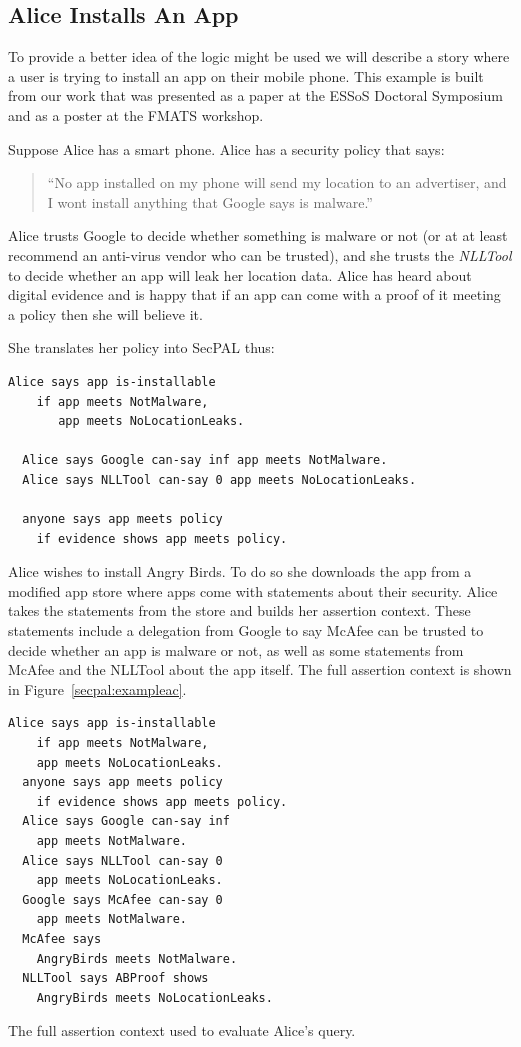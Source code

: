 \documentclass[a4paper,12pt,sfsidenotes]{tufte-book}
\begin{document}
\subsection{Alice Installs An App}

To provide a better idea of the logic might be used we will describe a story
where a user is trying to install an app on their mobile phone.  This example is
built from our work that was presented as a paper at the ESSoS Doctoral
Symposium\cite{Hallett:2014un} and as a poster at the FMATS workshop.

Suppose Alice has a smart phone.  Alice has a security policy that says:

\begin{quote}
    ``No app installed on my phone will send my location to an advertiser, and I
      wont install anything that Google says is malware.''
\end{quote}

Alice trusts Google to decide whether something is malware or not (or at at
least recommend an anti-virus vendor who can be trusted), and she trusts the
\emph{NLLTool} to decide whether an app will leak her location
data.  Alice has heard about digital evidence and is happy that if an app can
come with a proof of it meeting a policy then she will believe it.

She translates her policy into SecPAL thus:

\begin{lstlisting}[language=SecPAL]
  Alice says app is-installable 
    if app meets NotMalware, 
       app meets NoLocationLeaks.

  Alice says Google can-say inf app meets NotMalware.
  Alice says NLLTool can-say 0 app meets NoLocationLeaks.

  anyone says app meets policy
    if evidence shows app meets policy.
\end{lstlisting}

Alice wishes to install Angry Birds. To do so she downloads the app from a
modified app store where apps come with statements about their security.  Alice
takes the statements from the store and builds her assertion context.  These
statements include a delegation from Google to say McAfee can be trusted to
decide whether an app is malware or not, as well as some statements from McAfee
and the NLLTool about the app itself. The full assertion context is shown in
Figure~\ref{secpal:exampleac}.

\begin{marginfigure}\label{secpal:exampleac}
\begin{lstlisting}[language=SecPAL]
  Alice says app is-installable 
    if app meets NotMalware, 
    app meets NoLocationLeaks.
  anyone says app meets policy 
    if evidence shows app meets policy.
  Alice says Google can-say inf 
    app meets NotMalware.
  Alice says NLLTool can-say 0 
    app meets NoLocationLeaks.
  Google says McAfee can-say 0 
    app meets NotMalware.
  McAfee says 
    AngryBirds meets NotMalware.
  NLLTool says ABProof shows 
    AngryBirds meets NoLocationLeaks.
\end{lstlisting}
\caption{The full assertion context used to evaluate Alice's query.}
\end{marginfigure}
\end{document}
